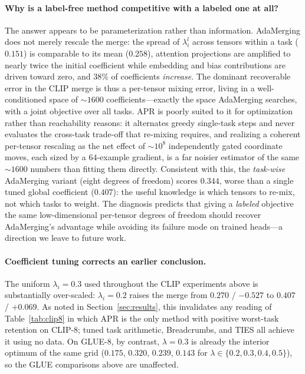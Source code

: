 \documentclass[11pt]{article}
\begin{document}
\paragraph{Why is a label-free method competitive with a labeled one at all?}
The answer appears to be parameterization rather than information. AdaMerging does not merely rescale the merge: the spread of $\lambda_i^l$ across tensors within a task ($0.151$) is comparable to its mean ($0.258$), attention projections are amplified to nearly twice the initial coefficient while embedding and bias contributions are driven toward zero, and $38\%$ of coefficients \emph{increase}. The dominant recoverable error in the CLIP merge is thus a per-tensor mixing error, living in a well-conditioned space of $\sim\!1600$ coefficients---exactly the space AdaMerging searches, with a joint objective over all tasks. APR is poorly suited to it for optimization rather than reachability reasons: it alternates greedy single-task steps and never evaluates the cross-task trade-off that re-mixing requires, and realizing a coherent per-tensor rescaling as the net effect of $\sim\!10^8$ independently gated coordinate moves, each sized by a $64$-example gradient, is a far noisier estimator of the same $\sim\!1600$ numbers than fitting them directly. Consistent with this, the \emph{task-wise} AdaMerging variant (eight degrees of freedom) scores $0.344$, worse than a single tuned global coefficient ($0.407$): the useful knowledge is which tensors to re-mix, not which tasks to weight. The diagnosis predicts that giving a \emph{labeled} objective the same low-dimensional per-tensor degrees of freedom should recover AdaMerging's advantage while avoiding its failure mode on trained heads---a direction we leave to future work.

\paragraph{Coefficient tuning corrects an earlier conclusion.}
The uniform $\lambda_i=0.3$ used throughout the CLIP experiments above is substantially over-scaled: $\lambda_i=0.2$ raises the merge from $0.270$ / $-0.527$ to $0.407$ / $+0.069$. As noted in Section~\ref{sec:results}, this invalidates any reading of Table~\ref{tab:clip8} in which APR is the only method with positive worst-task retention on CLIP-8; tuned task arithmetic, Breadcrumbs, and TIES all achieve it using no data. On GLUE-8, by contrast, $\lambda=0.3$ is already the interior optimum of the same grid ($0.175$, $\mathbf{0.320}$, $0.239$, $0.143$ for $\lambda\in\{0.2,0.3,0.4,0.5\}$), so the GLUE comparisons above are unaffected.
\end{document}
